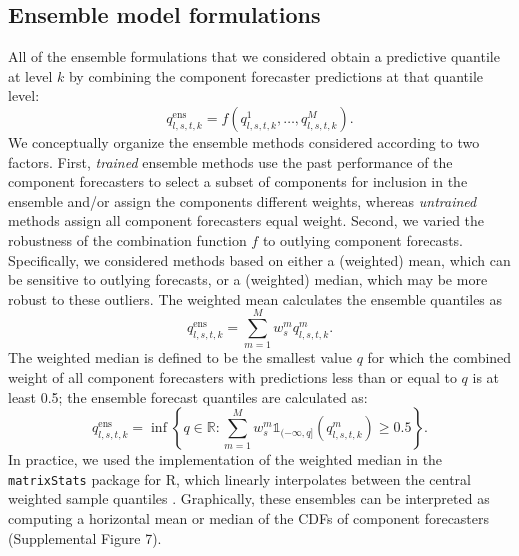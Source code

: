 \documentclass[11pt,3p,authoryear]{elsarticle}
\def\ens{\mathrm{ens}}
\begin{document}

\subsection{Ensemble model formulations}
\label{subsec:methods_ensembles}

All of the ensemble formulations that we considered obtain a predictive quantile at level $k$ by combining the component forecaster predictions at that quantile level:
$$
q^\ens_{l,s,t,k} = f(q^{1}_{l,s,t,k}, \ldots, q^{M}_{l,s,t,k}).
$$
We conceptually organize the ensemble methods considered according to two factors.
First, \textit{trained} ensemble methods use the past performance of the component forecasters to select a subset of components for inclusion in the ensemble and/or assign the components different weights, whereas \textit{untrained} methods assign all component forecasters equal weight.
Second, we varied the robustness of the combination function $f$ to outlying component forecasts.
Specifically, we considered methods based on either a (weighted) mean, which can be sensitive to outlying forecasts, or a (weighted) median, which may be more robust to these outliers.
The weighted mean calculates the ensemble quantiles as 
$$
q^\ens_{l,s,t,k} = \sum_{m = 1}^M w^m_{s} q^{m}_{l,s,t,k}.
$$
The weighted median is defined to be the smallest value $q$ for which the combined weight of all component forecasters with predictions less than or equal to $q$ is at least 0.5; the ensemble forecast quantiles are calculated as:
$$
q^\ens_{l,s,t,k} = \inf\left\{q \in \mathbb{R}: \sum_{m = 1}^M w^m_s \mathds{1}_{(-\infty, q]}(q^{m}_{l,s,t,k}) \geq 0.5\right\}.
$$
In practice, we used the implementation of the weighted median in the \verb`matrixStats` package for R, which linearly interpolates between the central weighted sample quantiles \citep{matrixStats}.
Graphically, these ensembles can be interpreted as computing a horizontal mean or median of the CDFs of component forecasters (Supplemental Figure 7).
\end{document}
